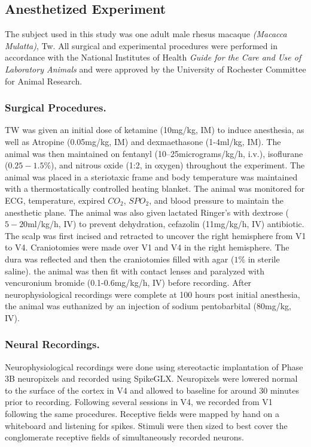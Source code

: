 \subsection*{Anesthetized Experiment}
The subject used in this study was one adult male rhesus macaque \textit{(Macacca Mulatta)}, Tw. All surgical and experimental procedures were performed in accordance with the National Institutes of Health \textit{Guide for the Care and Use of Laboratory Animals} and were approved by the University of Rochester Committee for Animal Research.

\subsubsection*{Surgical Procedures.}
TW was given an initial dose of ketamine (10mg/kg, IM) to induce anesthesia, as well as Atropine (0.05mg/kg, IM) and dexmaethasone (1-4ml/kg, IM). The animal was then maintained on fentanyl (10–25micrograms/kg/h, i.v.), isoflurane ($0.25-1.5\%$), and nitrous oxide (1:2, in oxygen) throughout the experiment. The animal was placed in a steriotaxic frame and body temperature was maintained with a thermostatically controlled heating blanket. The animal was monitored for ECG, temperature, expired $CO_2$, $SPO_2$, and blood pressure to maintain the anesthetic plane. The animal was also given lactated Ringer's with dextrose ($5-20$ml/kg/h, IV) to prevent dehydration, cefazolin (11mg/kg/h, IV) antibiotic. The scalp was first incised and retracted to uncover the right hemisphere from V1 to V4. Craniotomies were made over V1 and V4 in the right hemisphere. The dura was reflected and then the craniotomies filled with agar ($1\%$ in sterile saline). the animal was then fit with contact lenses and paralyzed with vencuronium bromide (0.1-0.6mg/kg/h, IV) before recording. After neurophysiological recordings were complete at 100 hours post initial anesthesia, the animal was euthanized by an injection of sodium pentobarbital (80mg/kg, IV).

\subsubsection*{Neural Recordings.}
Neurophysiological recordings were done using stereotactic implantation of Phase 3B neuropixels \parencite{Jun2017} and recorded using SpikeGLX. Neuropixels were lowered normal to the surface of the cortex in V4 and allowed to baseline for around 30 minutes prior to recording. Following several sessions in V4, we recorded from V1 following the same procedures. Receptive fields were mapped by hand on a whiteboard and listening for spikes. Stimuli were then sized to best cover the conglomerate receptive fields of simultaneously recorded neurons.

